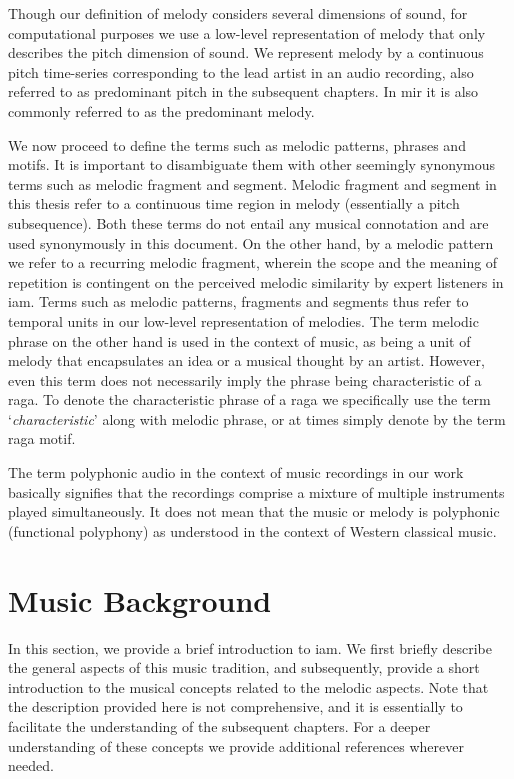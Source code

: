 Though our definition of melody considers several dimensions of sound, for computational purposes we use a low-level representation of melody that only describes the pitch dimension of sound. We represent melody by a continuous pitch time-series corresponding to the lead artist in an audio recording, also referred to as predominant pitch in the subsequent chapters. In \gls{mir} it is also commonly referred to as the predominant melody. 

We now proceed to define the terms such as melodic patterns, phrases and motifs. It is important to disambiguate them with other seemingly synonymous terms such as melodic fragment and segment. Melodic fragment and segment in this thesis refer to a continuous time region in melody (essentially a pitch subsequence). Both these terms do not entail any musical connotation and are used synonymously in this document. On the other hand, by a melodic pattern we refer to a recurring melodic fragment, wherein the scope and the meaning of repetition is contingent on the perceived melodic similarity by expert listeners in \gls{iam}.  Terms such as melodic patterns, fragments and segments thus refer to temporal units in our low-level representation of melodies. The term melodic phrase on the other hand is used in the context of music, as being a unit of melody that encapsulates an idea or a musical thought by an artist. However, even this term does not necessarily imply the phrase being characteristic of a \gls{raga}. To denote the characteristic phrase of a \gls{raga} we specifically use the term `\textit{characteristic}' along with melodic phrase, or at times simply denote by the term \gls{raga} motif. 

The term polyphonic audio in the context of music recordings in our work basically signifies that the recordings comprise a mixture of multiple instruments played simultaneously. It does not mean that the music or melody is polyphonic (functional polyphony) as understood in the context of Western classical music.

\section{Music Background}
\label{sec:music_background}

In this section, we provide a brief introduction to \gls{iam}. We first briefly describe the general aspects of this  music tradition, and subsequently, provide a short introduction to the musical concepts related to the melodic aspects. Note that the description provided here is not comprehensive, and it is essentially to facilitate the understanding of the subsequent chapters. For a deeper understanding of these concepts we provide additional references wherever needed. 

